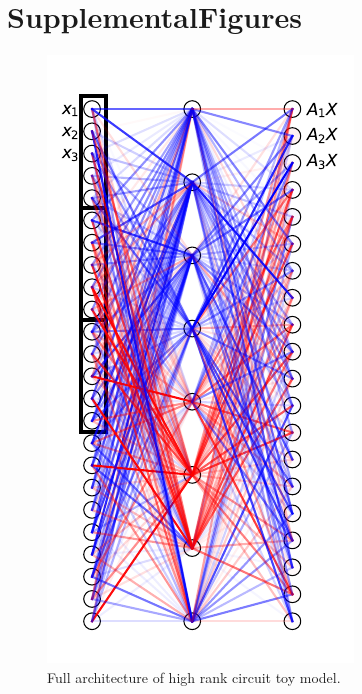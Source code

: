 \documentclass{article}
\theoremstyle{plain}
\theoremstyle{definition}
\theoremstyle{remark}
\begin{document}
\section{SupplementalFigures}


\begin{figure}[ht]
    \centerline{\includegraphics{../figures/s1_high_rank_circuit_setup.pdf}}
    \centering
    \caption{Full architecture of high rank circuit toy model.}\label{fig:s1_high_rank_circuit_setup}
\end{figure}
\end{document}
